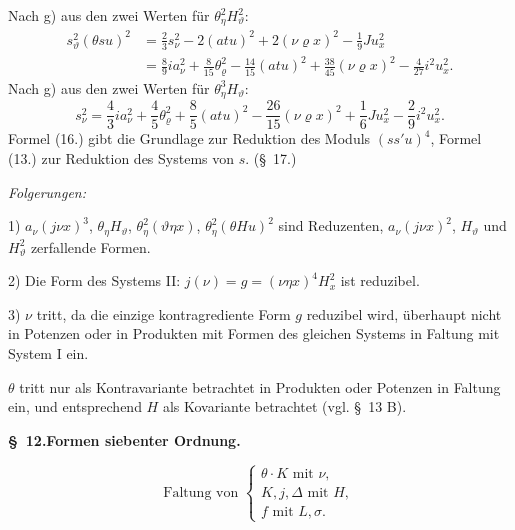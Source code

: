 \documentclass[11pt]{article}
\newcommand{\A}{\Delta}
\newcommand{\R}{\varrho}
\begin{document}
Nach g) aus den zwei Werten für $\theta_\eta^2H_\vartheta^2$:
\[
\tag{15}
\begin{aligned}
s_\vartheta^2(\theta su)^2
&=\frac23s_\nu^2-2(atu)^2+2(\nu\R x)^2-\frac19Ju_x^2\\
&=\frac89ia_\nu^2+\frac8{15}\theta_\R^2-\frac{14}{15}(atu)^2+\frac{38}{45}(\nu\R x)^2-\frac4{27}i^2u_x^2.
\end{aligned}
\]
Nach g) aus den zwei Werten für $\theta_\eta^3H_\vartheta$:
\[
\tag{16}
s_\nu^2=\frac43ia_\nu^2+\frac45\theta_\R^2+\frac85(atu)^2-\frac{26}{15}(\nu\R x)^2+\frac16Ju_x^2-\frac29i^2u_x^2.
\]
Formel (16.) gibt die Grundlage zur Reduktion des Moduls $(ss'u)^4$, Formel (13.) zur Reduktion des Systems von $s$. (\S\ 17.)

\noindent\emph{Folgerungen:}

1) $a_\nu(j\nu x)^3$, $\theta_\eta H_\vartheta$, $\theta_\eta^2(\vartheta\eta x)$, $\theta_\eta^2(\theta Hu)^2$ sind Reduzenten, $a_\nu(j\nu x)^2$, $H_\vartheta$ und $H_\vartheta^2$ zerfallende Formen.

2) Die Form des Systems II: $j(\nu)=g=(\nu\eta x)^4H_x^2$ ist reduzibel.

3) $\nu$ tritt, da die einzige kontragrediente Form $g$ reduzibel wird, überhaupt nicht in Potenzen oder in Produkten mit Formen des gleichen Systems in Faltung mit System I ein.

$\theta$ tritt nur als Kontravariante betrachtet in Produkten oder Potenzen in Faltung ein, und entsprechend $H$ als Kovariante betrachtet (vgl. \S\ 13 B).

\begin{center}
\textbf{\S\ 12.\quad Formen siebenter Ordnung.}
\end{center}
\[
\text{Faltung von }\left\{\begin{array}{l}
\theta\cdot K\text{ mit }\nu,\\
K,j,\A\text{ mit }H,\\
f\text{ mit }L,\sigma.
\end{array}\right.
\]
\end{document}
